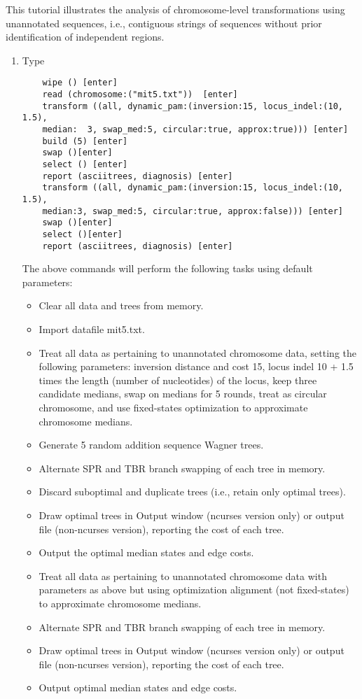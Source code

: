 This tutorial illustrates the analysis of chromosome-level transformations using 
unannotated sequences, i.e., contiguous strings of sequences without prior 
identification of independent regions.
\begin{enumerate}
    \item Type
    \begin{verbatim}
    wipe () [enter]
    read (chromosome:("mit5.txt"))  [enter]
    transform ((all, dynamic_pam:(inversion:15, locus_indel:(10, 1.5), 
    median:  3, swap_med:5, circular:true, approx:true))) [enter]
    build (5) [enter]
    swap ()[enter]
    select () [enter]
    report (asciitrees, diagnosis) [enter]
    transform ((all, dynamic_pam:(inversion:15, locus_indel:(10, 1.5), 
    median:3, swap_med:5, circular:true, approx:false))) [enter]
    swap ()[enter]
    select ()[enter]
    report (asciitrees, diagnosis) [enter]
    \end{verbatim}

The above commands will perform the following tasks using default parameters:
\begin{itemize}
    \item Clear all data and trees from memory.
    \item Import datafile mit5.txt.
    \item Treat all data as pertaining to unannotated chromosome data, setting the 
        following parameters: inversion distance and cost 15, locus indel 10 + 1.5 
        times the length (number of nucleotides) of the locus, keep three 
        candidate medians, swap on medians for 5 rounds, treat as circular 
        chromosome, and use fixed-states optimization to approximate chromosome 
        medians.
    \item Generate 5 random addition sequence Wagner trees.
    \item Alternate SPR and TBR branch swapping of each tree in memory.
    \item Discard suboptimal and duplicate trees (i.e., retain only optimal trees).
    \item Draw optimal trees in \poy Output window (ncurses version only) or output 
        file (non-ncurses version), reporting the cost of each tree.
    \item Output the optimal median states and edge costs.
    \item Treat all data as pertaining to unannotated chromosome data with 
        parameters as above but using optimization alignment (not fixed-states) to 
        approximate chromosome medians.   
    \item Alternate SPR and TBR branch swapping of each tree in memory.
    \item Draw optimal trees in \poy Output window (ncurses version only) or output 
        file (non-ncurses version), reporting the cost of each tree.
    \item Output optimal median states and edge costs.
\end{itemize}
\end{enumerate}
